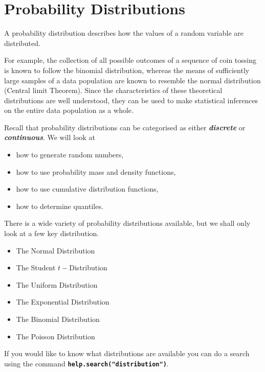\documentclass[a4paper,12pt]{article}
\begin{document}
\section{Probability Distributions}
A probability distribution describes how the values of a random variable are distributed. 

For example, the collection of all possible outcomes of a sequence of coin tossing is known to follow the binomial distribution, whereas the means of sufficiently large samples of a data population are known to resemble the normal distribution (Central limit Theorem). Since the characteristics of these theoretical distributions are well understood, they can be used to make statistical inferences on the entire data population as a whole.

Recall that probability distributions can be categorised as either \textit{\textbf{discrete}} or \textit{\textbf{continuous}}.
We will look at  
\begin{itemize}
\item how to generate random numbers,
\item how to use probability mass and density functions,
\item how to use cumulative distribution functions,
\item how to determine quantiles.
\end{itemize} 

There is a wide variety of probability distributions available, but we shall only look at a few key distribution. 

\begin{itemize}
\item	The Normal Distribution
\item	The Student $t-$Distribution
\item   The Uniform Distribution
\item	The Exponential Distribution
\item	The Binomial Distribution
\item	The Poisson Distribution
\end{itemize}

If you would like to know what distributions are available you can do a search using the command \texttt{\textbf{help.search("distribution")}}. 

\end{document}
